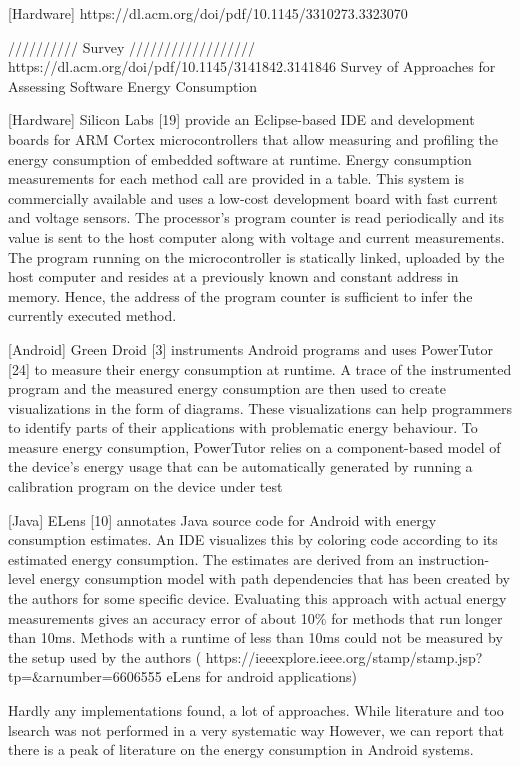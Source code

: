 \documentclass[../theses.tex]{subfiles}
\begin{document}
[Hardware]
https://dl.acm.org/doi/pdf/10.1145/3310273.3323070

////////// Survey //////////////////
https://dl.acm.org/doi/pdf/10.1145/3141842.3141846
Survey of Approaches for Assessing Software Energy Consumption

[Hardware] Silicon Labs [19] provide an Eclipse-based IDE and development boards for ARM Cortex microcontrollers that allow measuring and profiling the energy consumption of embedded software at runtime. Energy consumption measurements for each method call are provided in a table. This system is commercially available and uses a low-cost development
board with fast current and voltage sensors. The processor’s program counter is read periodically and its value is sent to the host computer along with voltage and current
measurements. The program running on the microcontroller is statically linked, uploaded by the host computer and resides at a previously known and constant address in memory. Hence, the address of the program counter is sufficient to infer the currently executed method.

[Android] Green Droid [3] instruments Android programs and uses PowerTutor [24] to measure their energy consumption at runtime. A trace of the instrumented program and the measured energy consumption are then used to create visualizations in the form of diagrams. These visualizations can help programmers to identify parts of their applications with problematic energy behaviour. To measure energy consumption, PowerTutor relies on a component-based model of the device’s energy usage that can be automatically generated by running a calibration program on the device under test 

[Java] ELens [10] annotates Java source code for Android with energy consumption estimates. An IDE visualizes this by coloring code according to its estimated energy consumption. The estimates are derived from an instruction-level energy consumption model with path dependencies that has been created by the authors for some specific device.  Evaluating this approach with actual energy measurements gives an accuracy error of about 10\% for methods that run longer than 10ms. Methods with a runtime of less than 10ms could not be measured by the setup used by the authors ( https://ieeexplore.ieee.org/stamp/stamp.jsp?tp=&arnumber=6606555 eLens for android applications)

Hardly any implementations found, a lot of approaches. While literature and too lsearch was not performed in a very systematic way
However, we can report that there is a peak of literature on the energy consumption in Android systems. 
\end{document}
